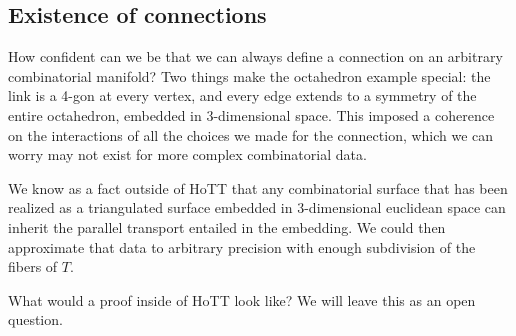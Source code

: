 \subsection{Existence of connections}

How confident can we be that we can always define a connection on an arbitrary combinatorial manifold? Two things make the octahedron example special: the link is a 4-gon at every vertex, and every edge extends to a symmetry of the entire octahedron, embedded in 3-dimensional space. This imposed a coherence on the interactions of all the choices we made for the connection, which we can worry may not exist for more complex combinatorial data.

We know as a fact outside of HoTT that any combinatorial surface that has been realized as a triangulated surface embedded in 3-dimensional euclidean space can inherit the parallel transport entailed in the embedding. We could then approximate that data to arbitrary precision with enough subdivision of the fibers of \( T \).

What would a proof inside of HoTT look like? We will leave this as an open question.

